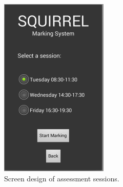 \documentclass[11pt,a4paper]{article}
\begin{document}
		\begin{figure}[h!]
		\centering
		\includegraphics[width=0.7\linewidth]{./mobile_selectSession}
		\caption{Screen design of assessment sessions.}
		\label{fig:mobile_selectSession}
		\end{figure}
\pagebreak			
\end{document}
